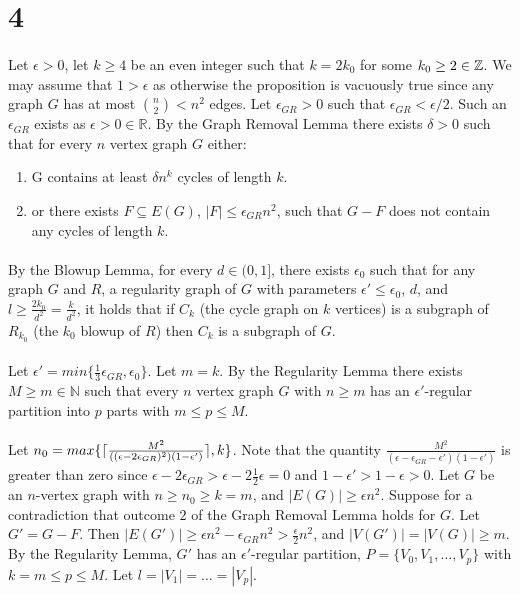 \documentclass[letterpaper,12pt,oneside,onecolumn]{article}
\DeclarePairedDelimiter{\ceil}{\lceil}{\rceil}
\newcommand{\N}{\mathbb{N}} \newcommand{\R}{\mathbb{R}}
\begin{document}
\section*{4}
\paragraph{}
Let $\epsilon > 0$, let $k \geq 4$ be an even integer such that $k = 2k_0$ for some $k_0\geq 2 \in \mathbb{Z}$. We may assume that $1 > \epsilon$ as otherwise the proposition is vacuously true since any graph $G$ has at most $ {n\choose 2} < n^2$ edges. Let $\epsilon_{GR} > 0$ such that $\epsilon_{GR} < \epsilon/2$. Such an $\epsilon_{GR}$ exists as $\epsilon >0 \in \R$.  By the Graph Removal Lemma there exists $\delta > 0$ such that for every $n$ vertex graph $G$ either:
\begin{enumerate}
\item G contains at least $\delta n^k$ cycles of length $k$.\\
\item or there exists $F \subseteq E(G)$, $|F| \leq \epsilon_{GR} n^2$, such that $G - F$ does not contain any cycles of length $k$.
\end{enumerate}
\paragraph{}
By the Blowup Lemma, for every $d \in (0,1]$, there exists $\epsilon_0$ such that for any graph $G$ and $R$, a regularity graph of $G$ with parameters $\epsilon' \leq \epsilon_0$, $d$, and $l \geq \frac{2k_0}{d^2} = \frac{k}{d^2}$, it holds that if $C_k$ (the cycle graph on $k$ vertices) is a subgraph of $R_{k_0}$ (the $k_0$ blowup of $R$) then $C_k$ is a subgraph of $G$. 
\paragraph{}
Let $\epsilon' = min\{\frac{1}{3}\epsilon_{GR}, \epsilon_0\}$. Let $m = k$. By the Regularity Lemma there exists $M\geq m \in \N$ such that every $n$ vertex graph $G$ with $n \geq m$ has an $\epsilon'$-regular partition into $p$ parts with $m \leq p \leq M$.
\paragraph{}
Let $n_0 = max\{\ceil{\frac{M^2}{((\epsilon-2\epsilon_{GR})^2)(1-\epsilon')}}, k\}$. Note that the quantity $\frac{M^2}{(\epsilon-\epsilon_{GR}-\epsilon')(1-\epsilon')}$ is greater than zero since $\epsilon-2\epsilon_{GR} > \epsilon - 2\frac{1}{2}\epsilon = 0$ and $1-\epsilon' > 1-\epsilon > 0$. Let $G$ be an $n$-vertex graph with $n \geq n_0 \geq k = m$, and $|E(G)| \geq \epsilon n^2$. Suppose for a contradiction that outcome $2$ of the Graph Removal Lemma holds for $G$. Let $G' = G - F$. Then $|E(G')| \geq \epsilon n^2 - \epsilon_{GR} n^2 > \frac{\epsilon}{2}n^2$, and $|V(G')| = |V(G)| \geq m$. By the Regularity Lemma, $G'$ has an $\epsilon'$-regular partition, $P=\{V_0, V_1, \dots, V_p\}$ with $k=m \leq p \leq M$. Let $l = |V_1| = \dots = |V_p|$.
\end{document}
